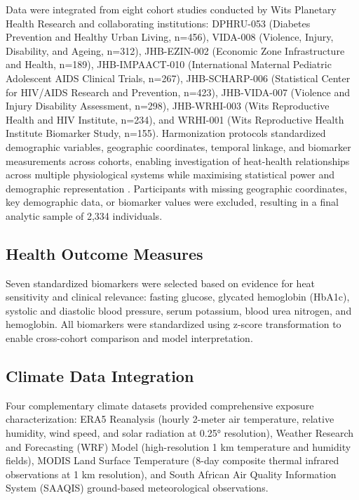 \documentclass[11pt,a4paper]{article}
\begin{document}
Data were integrated from eight cohort studies conducted by Wits Planetary Health Research and collaborating institutions: DPHRU-053 (Diabetes Prevention and Healthy Urban Living, n=456), VIDA-008 (Violence, Injury, Disability, and Ageing, n=312), JHB-EZIN-002 (Economic Zone Infrastructure and Health, n=189), JHB-IMPAACT-010 (International Maternal Pediatric Adolescent AIDS Clinical Trials, n=267), JHB-SCHARP-006 (Statistical Center for HIV/AIDS Research and Prevention, n=423), JHB-VIDA-007 (Violence and Injury Disability Assessment, n=298), JHB-WRHI-003 (Wits Reproductive Health and HIV Institute, n=234), and WRHI-001 (Wits Reproductive Health Institute Biomarker Study, n=155). Harmonization protocols standardized demographic variables, geographic coordinates, temporal linkage, and biomarker measurements across cohorts, enabling investigation of heat-health relationships across multiple physiological systems while maximising statistical power and demographic representation \cite{macleod2022cohort}. Participants with missing geographic coordinates, key demographic data, or biomarker values were excluded, resulting in a final analytic sample of 2,334 individuals.

\subsection{Health Outcome Measures}

Seven standardized biomarkers were selected based on evidence for heat sensitivity and clinical relevance: fasting glucose, glycated hemoglobin (HbA1c), systolic and diastolic blood pressure, serum potassium, blood urea nitrogen, and hemoglobin. All biomarkers were standardized using z-score transformation to enable cross-cohort comparison and model interpretation.

\subsection{Climate Data Integration}

Four complementary climate datasets provided comprehensive exposure characterization: ERA5 Reanalysis (hourly 2-meter air temperature, relative humidity, wind speed, and solar radiation at 0.25° resolution), Weather Research and Forecasting (WRF) Model (high-resolution 1 km temperature and humidity fields), MODIS Land Surface Temperature (8-day composite thermal infrared observations at 1 km resolution), and South African Air Quality Information System (SAAQIS) ground-based meteorological observations.
\end{document}
